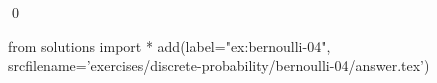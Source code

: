 
\begin{ex} 
  \label{ex:bernoulli-04}
  
  \qed
\end{ex} 
\begin{python0}
from solutions import *
add(label="ex:bernoulli-04",
    srcfilename='exercises/discrete-probability/bernoulli-04/answer.tex') 
\end{python0}
